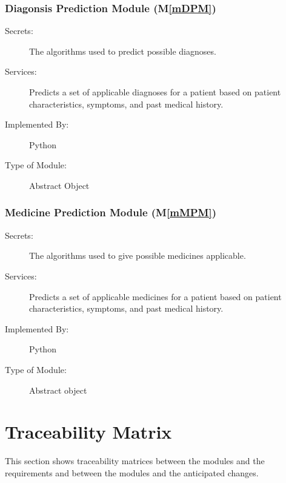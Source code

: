 \documentclass[12pt, titlepage]{article}
\newcommand{\mref}[1]{M\ref{#1}}
\begin{document}
\subsubsection{Diagonsis Prediction Module (\mref{mDPM})}

\begin{description}
\item[Secrets:]The algorithms used to predict possible diagnoses.
\item[Services:]Predicts a set of applicable diagnoses for a patient based on patient characteristics, symptoms, and past medical history.
\item[Implemented By:]Python
\item[Type of Module:]Abstract Object
\end{description}

\subsubsection{Medicine Prediction Module (\mref{mMPM})}

\begin{description}
\item[Secrets:]The algorithms used to give possible medicines applicable.
\item[Services:]Predicts a set of applicable medicines for a patient based on patient characteristics, symptoms, and past medical history.
\item[Implemented By:]Python
\item[Type of Module:]Abstract object
\end{description}


\section{Traceability Matrix} \label{SecTM}

This section shows traceability matrices between the modules and the requirements and between the modules and the anticipated changes.
\end{document}
